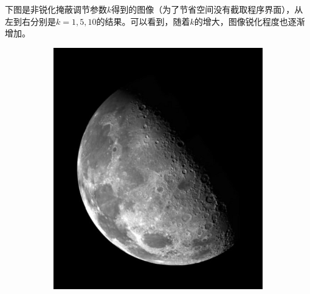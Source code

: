 \documentclass{article}
\begin{document}
下图是非锐化掩蔽调节参数$k$得到的图像（为了节省空间没有截取程序界面），从左到右分别是$k=1, 5, 10$的结果。可以看到，随着$k$的增大，图像锐化程度也逐渐增加。

\begin{figure}[htbp]
    \centering
    \begin{subfigure}{.3\textwidth}
        \includegraphics[width=\linewidth]{img/usm/1.png}
    \end{subfigure}
    \begin{subfigure}{.3\textwidth}

\end{subfigure}
\end{figure}
\end{document}
